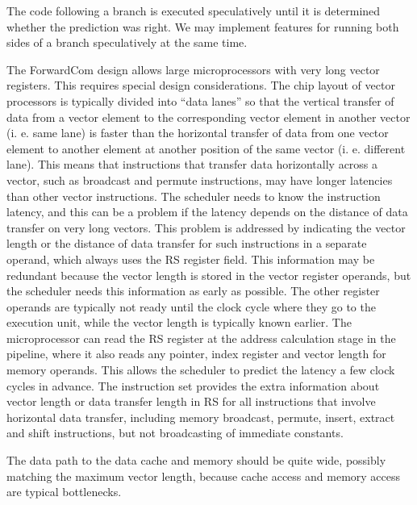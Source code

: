\documentclass[forwardcom.tex]{subfiles}
\begin{document}
The code following a branch is executed speculatively until it is determined whether the prediction was right. We may implement features for running both sides of a branch speculatively at the same time. 
\vspace{2mm}

The ForwardCom design allows large microprocessors with very long vector registers. This requires special design considerations. The chip layout of vector processors is typically divided into ``data lanes'' so that the vertical transfer of data from a vector element to the corresponding 
vector element in another vector (i. e. same lane) is faster than the horizontal transfer of data from one vector element to another element at another position of the same vector (i. e. different lane). This means that instructions that transfer data horizontally across a vector, such as broadcast and permute instructions, may have longer latencies than other vector instructions. The scheduler needs to know the instruction latency, and this can be a problem if the latency depends on the distance of data transfer on very long vectors. This problem is addressed by indicating the vector length or the distance of data transfer for such instructions in a separate operand, which always uses the RS register field. This information may be redundant because the vector length is stored in the vector register operands, but the scheduler needs this information as early as possible. The other register operands are typically not ready until the clock cycle where they go to the execution unit, while the vector length is typically known earlier. The microprocessor can read the RS register at the address calculation stage in the pipeline, where it also reads any pointer, index register and vector length for memory operands. This allows the scheduler to predict the latency a few clock cycles in advance. The instruction set provides the extra information about vector length or data transfer length in RS for all instructions that involve horizontal data transfer, including memory broadcast, permute, insert, extract and shift instructions, but not broadcasting of immediate constants. 
\vspace{2mm}

The data path to the data cache and memory should be quite wide, possibly matching the maximum vector length, because cache access and memory access are typical bottlenecks.
\end{document}
